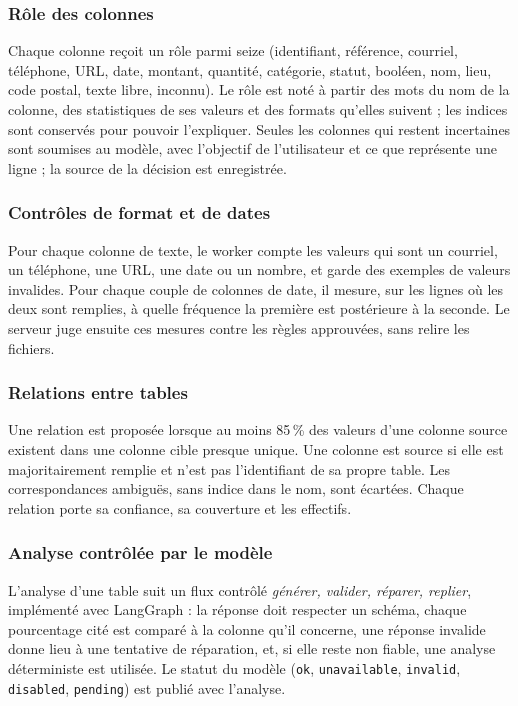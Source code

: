 \subsubsection{Rôle des colonnes}

Chaque colonne reçoit un rôle parmi seize (identifiant, référence, courriel, téléphone, URL, date, montant, quantité, catégorie, statut, booléen, nom, lieu, code postal, texte libre, inconnu). Le rôle est noté à partir des mots du nom de la colonne, des statistiques de ses valeurs et des formats qu'elles suivent ; les indices sont conservés pour pouvoir l'expliquer. Seules les colonnes qui restent incertaines sont soumises au modèle, avec l'objectif de l'utilisateur et ce que représente une ligne ; la source de la décision est enregistrée.

\subsubsection{Contrôles de format et de dates}

Pour chaque colonne de texte, le worker compte les valeurs qui sont un courriel, un téléphone, une URL, une date ou un nombre, et garde des exemples de valeurs invalides. Pour chaque couple de colonnes de date, il mesure, sur les lignes où les deux sont remplies, à quelle fréquence la première est postérieure à la seconde. Le serveur juge ensuite ces mesures contre les règles approuvées, sans relire les fichiers.

\subsubsection{Relations entre tables}

Une relation est proposée lorsque au moins 85\,\% des valeurs d'une colonne source existent dans une colonne cible presque unique. Une colonne est source si elle est majoritairement remplie et n'est pas l'identifiant de sa propre table. Les correspondances ambiguës, sans indice dans le nom, sont écartées. Chaque relation porte sa confiance, sa couverture et les effectifs.

\subsubsection{Analyse contrôlée par le modèle}

L'analyse d'une table suit un flux contrôlé \textit{générer, valider, réparer, replier}, implémenté avec LangGraph : la réponse doit respecter un schéma, chaque pourcentage cité est comparé à la colonne qu'il concerne, une réponse invalide donne lieu à une tentative de réparation, et, si elle reste non fiable, une analyse déterministe est utilisée. Le statut du modèle (\texttt{ok}, \texttt{unavailable}, \texttt{invalid}, \texttt{disabled}, \texttt{pending}) est publié avec l'analyse.

